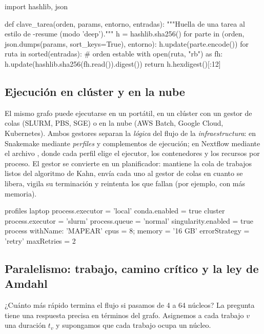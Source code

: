 \begin{codigo}
import hashlib, json

def clave_tarea(orden, params, entorno, entradas):
    """Huella de una tarea al estilo de -resume (modo 'deep')."""
    h = hashlib.sha256()
    for parte in (orden, json.dumps(params, sort_keys=True), entorno):
        h.update(parte.encode())
    for ruta in sorted(entradas):                 # orden estable
        with open(ruta, "rb") as fh:
            h.update(hashlib.sha256(fh.read()).digest())
    return h.hexdigest()[:12]
\end{codigo}

\subsection{Ejecución en clúster y en la nube}

El mismo grafo puede ejecutarse en un portátil, en un clúster con un gestor de colas (SLURM, PBS, SGE) o en la nube (AWS Batch, Google Cloud, Kubernetes). Ambos gestores separan la \emph{lógica} del flujo de la \emph{infraestructura}: en Snakemake mediante \emph{perfiles} y complementos de ejecución; en Nextflow mediante el archivo , donde cada perfil elige el ejecutor, los contenedores y los recursos por proceso. El gestor se convierte en un planificador: mantiene la cola de trabajos listos del algoritmo de Kahn, envía cada uno al gestor de colas en cuanto se libera, vigila su terminación y reintenta los que fallan (por ejemplo, con más memoria).

\begin{codigo}
profiles {
    laptop {
        process.executor = 'local'
        conda.enabled = true
    }
    cluster {
        process.executor = 'slurm'
        process.queue = 'normal'
        singularity.enabled = true
        process {
            withName: 'MAPEAR' { cpus = 8; memory = '16 GB' }
            errorStrategy = 'retry'
            maxRetries = 2
        }
    }
}
\end{codigo}

\subsection{Paralelismo: trabajo, camino crítico y la ley de Amdahl}\label{sec:18-paralelo}

¿Cuánto más rápido termina el flujo si pasamos de 4 a 64 núcleos? La pregunta tiene una respuesta precisa en términos del grafo. Asignemos a cada trabajo $v$ una duración $t_v$ y supongamos que cada trabajo ocupa un núcleo.

